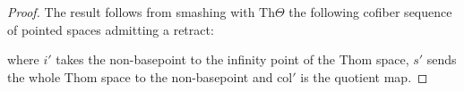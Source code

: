 \documentclass[10pt,a4paper]{amsart}
\newcommand{\Th}{\mathrm{Th}}
\begin{document}
\begin{proof} The result follows from smashing with $\Th\Theta$ the following cofiber sequence of pointed spaces admitting a retract:
    \begin{center}
\end{center}
where $i'$ takes the non-basepoint to the infinity point of the Thom space, $s'$ sends the whole Thom space to the non-basepoint and $\mathrm{col}'$ is the quotient map.\end{proof}
\end{document}
